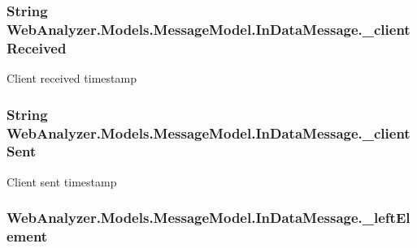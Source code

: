 \subsubsection[{\+\_\+client\+Received}]{\setlength{\rightskip}{0pt plus 5cm}String Web\+Analyzer.\+Models.\+Message\+Model.\+In\+Data\+Message.\+\_\+client\+Received\hspace{0.3cm}{\ttfamily [private]}}\label{class_web_analyzer_1_1_models_1_1_message_model_1_1_in_data_message_a2cc19c547d536622b261fc8798e59dca}


Client received timestamp 

\hypertarget{class_web_analyzer_1_1_models_1_1_message_model_1_1_in_data_message_ae2ac2367bd8e3d621aec791d923481f5}{}
\subsubsection[{\+\_\+client\+Sent}]{\setlength{\rightskip}{0pt plus 5cm}String Web\+Analyzer.\+Models.\+Message\+Model.\+In\+Data\+Message.\+\_\+client\+Sent\hspace{0.3cm}{\ttfamily [private]}}\label{class_web_analyzer_1_1_models_1_1_message_model_1_1_in_data_message_ae2ac2367bd8e3d621aec791d923481f5}


Client sent timestamp 

\hypertarget{class_web_analyzer_1_1_models_1_1_message_model_1_1_in_data_message_a95db3eadcb298b75ea183c5bbf042a57}{}
\subsubsection[{\+\_\+left\+Element}]{ Web\+Analyzer.\+Models.\+Message\+Model.\+In\+Data\+Message.\+\_\+left\+Element\hspace{0.3cm}{\ttfamily [private]}}\label{class_web_analyzer_1_1_models_1_1_message_model_1_1_in_data_message_a95db3eadcb298b75ea183c5bbf042a57}


